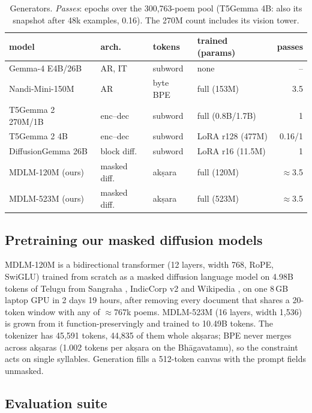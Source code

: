 \documentclass[11pt]{article}
\begin{document}
\begin{table}[t]
\centering\scriptsize\setlength{\tabcolsep}{2.4pt}
\begin{tabular}{@{}llllr@{}}
\toprule
model & arch. & tokens & trained (params) & passes \\
\midrule
Gemma-4 E4B/26B & AR, IT & subword & none & -- \\
Nandi-Mini-150M & AR & byte BPE & full (153M) & 3.5 \\
T5Gemma 2 270M/1B & enc--dec & subword & full (0.8B/1.7B) & 1 \\
T5Gemma 2 4B & enc--dec & subword & LoRA r128 (477M) & 0.16/1 \\
DiffusionGemma 26B & block diff. & subword & LoRA r16 (11.5M) & 1 \\
MDLM-120M (ours) & masked diff. & akṣara & full (120M) & $\approx$3.5 \\
MDLM-523M (ours) & masked diff. & akṣara & full (523M) & $\approx$3.5 \\
\bottomrule
\end{tabular}
\caption{Generators. \emph{Passes}: epochs over the 300,763-poem pool (T5Gemma 4B: also its snapshot after 48k
examples, 0.16). The 270M count includes its vision tower.}
\label{tab:models}
\end{table}

\subsection{Pretraining our masked diffusion models}\label{sec:pretraining}

MDLM-120M is a bidirectional transformer (12 layers, width 768, RoPE, SwiGLU) trained from scratch as a masked
diffusion language model \citep{sahoo2024mdlm} on 4.98B tokens of Telugu from Sangraha
\citep{khan2024indicllmsuite}, IndicCorp v2 \citep{doddapaneni2023indiccorp} and Wikipedia
\citep{wikimedia2023telugu}, on one 8\,GB laptop GPU in 2 days 19 hours, after removing every document that
shares a 20-token window with any of $\approx$767k poems. MDLM-523M (16 layers, width 1,536) is grown from it
function-preservingly and trained to 10.49B tokens. The tokenizer has 45,591 tokens, 44,835 of them whole
akṣaras; BPE never merges across akṣaras (1.002 tokens per akṣara on the Bhāgavatamu), so the constraint acts
on single syllables. Generation fills a 512-token canvas with the prompt fields unmasked.

\subsection{Evaluation suite}\label{sec:eval}
\end{document}
